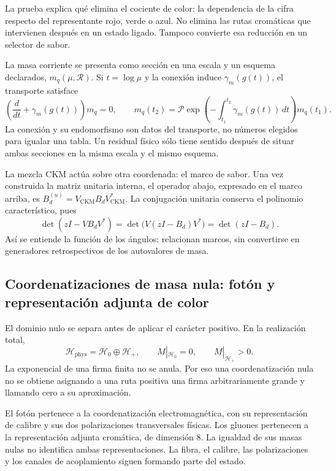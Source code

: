 La prueba explica qué elimina el cociente de color: la dependencia de
la cifra respecto del representante rojo, verde o azul. No elimina las
rutas cromáticas que intervienen después en un estado ligado. Tampoco
convierte esa reducción en un selector de sabor.

La masa corriente se presenta como sección en una escala y un esquema
declarados, \(m_q(\mu,\mathscr R)\). Si \(t=\log\mu\) y la conexión
induce \(\gamma_m(g(t))\), el transporte satisface
\[
 \left(\frac{d}{dt}+\gamma_m(g(t))\right)m_q=0,
 \qquad
 m_q(t_2)=\mathcal P\exp\left(-\int_{t_1}^{t_2}
 \gamma_m(g(t))\,dt\right)m_q(t_1).
\]
La conexión y su endomorfismo son datos del transporte, no números
elegidos para igualar una tabla. Un residual físico sólo tiene sentido
después de situar ambas secciones en la misma escala y el mismo esquema.

La mezcla CKM actúa sobre otra coordenada: el marco de sabor. Una vez
construida la matriz unitaria interna, el operador abajo, expresado en
el marco arriba, es \(B_d^{(u)}=V_{\mathrm{CKM}}B_dV_{\mathrm{CKM}}^*\).
La conjugación unitaria conserva el polinomio característico, pues
\[
 \det(zI-VB_dV^*)=\det\bigl(V(zI-B_d)V^*\bigr)=\det(zI-B_d).
\]
Así se entiende la función de los ángulos: relacionan marcos, sin
convertirse en generadores retrospectivos de los autovalores de masa.

\subsection{Coordenatizaciones de masa nula: fotón y representación adjunta de color}
\label{vi:subsec:nulo-familias}

El dominio nulo se separa antes de aplicar el carácter positivo. En la
realización total,
\[
 \mathcal H_{\mathrm{phys}}=\mathcal H_0\oplus\mathcal H_+,
 \qquad M|_{\mathcal H_0}=0,\qquad M|_{\mathcal H_+}>0.
\]
La exponencial de una firma finita no se anula. Por eso una coordenatización nula
no se obtiene asignando a una ruta positiva una firma arbitrariamente
grande y llamando cero a su aproximación.

El fotón pertenece a la coordenatización electromagnética, con su representación
de calibre y sus dos polarizaciones transversales físicas. Los gluones
pertenecen a la representación adjunta cromática, de dimensión \(8\).
La igualdad de sus masas nulas no identifica ambas representaciones.
La fibra, el calibre, las polarizaciones y los canales de acoplamiento
siguen formando parte del estado.

